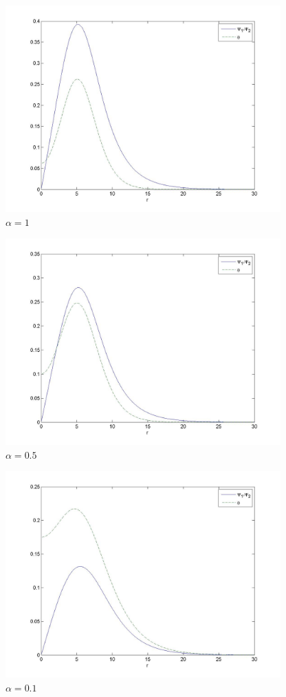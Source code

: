 \begin{figure}[h]
  \centering
  \includegraphics[width=300pt]{fig4_3}
  \caption{$\alpha=1$} 
\end{figure} 
\begin{figure}[h]
  \centering
  \includegraphics[width=300pt]{fig4_4}
  \caption{$\alpha=0.5$} 
\end{figure} 
\begin{figure}[h]
  \centering
  \includegraphics[width=300pt]{fig4_5}
  \caption{$\alpha=0.1$} 
\end{figure} 
